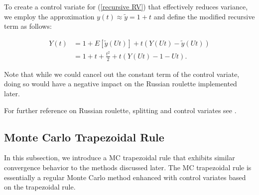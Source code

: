 \documentclass[a4paper,12pt]{article}
\begin{document}
\begin{example} \label{ex:CV}
    To create a control variate for (\ref{recursive RV}) that
    effectively reduces variance, we employ the approximation
    $y(t) \approx \tilde{y} =1+t$ and define the modified recursive term as follows:

    \begin{align}
        Y(t) & = 1 + E[\tilde{y}(Ut)] + t(Y(Ut) - \tilde{y}(Ut)) \\
             & = 1 + t + \frac{t^2}{2} + t(Y(Ut) - 1 - Ut).
    \end{align}

    Note that while we could cancel out the constant term
    of the control variate, doing so would have a negative impact
    on the Russian roulette implemented later.
\end{example}

\vspace*{0.2cm}
\begin{pythonn}
\end{pythonn}

\begin{related}[MC modification]
    For further reference on Russian roulette, splitting and control variates
    see \cite{veach_robust_1997}.
\end{related}

\subsection{Monte Carlo Trapezoidal Rule}

In this subsection, we introduce a MC trapezoidal rule that
exhibits similar convergence behavior to the methods discussed later.
The MC trapezoidal rule is essentially a regular Monte Carlo method
enhanced with control variates based on the trapezoidal rule.
\end{document}
